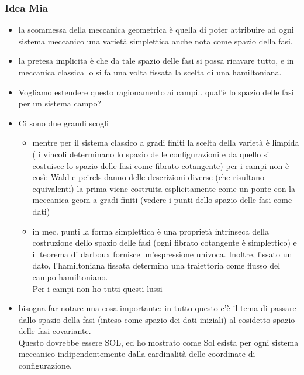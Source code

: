 \documentclass[Main]{subfiles}
\begin{document}
		\subsubsection{Idea Mia}
			\begin{itemize}
				\item la scommessa della meccanica geometrica è quella di poter attribuire ad ogni sistema meccanico una varietà simplettica anche nota come spazio della fasi.
				\item la pretesa implicita è che da tale spazio delle fasi si possa ricavare tutto, e in meccanica classica lo si fa una volta fissata la scelta di una hamiltoniana.
				\item Vogliamo estendere questo ragionamento ai campi.. qual'è lo spazio delle fasi per un sistema campo?
				\item Ci sono due grandi scogli
					\begin{itemize}
						\item mentre per il sistema classico a gradi finiti la scelta della varietà è limpida ( i vincoli determinano lo spazio delle configurazioni e da quello si costuisce lo spazio delle fasi come fibrato cotangente) per i campi non è così: Wald e peirels danno delle descrizioni diverse (che risultano equivalenti) la prima viene costruita esplicitamente come un ponte  con la meccanica geom a gradi finiti (vedere i punti dello spazio delle fasi come dati)
						\item in mec. punti la forma simplettica è una proprietà intrinseca della costruzione dello spazio delle fasi (ogni fibrato cotangente è simplettico) e il teorema di darboux fornisce un'espressione univoca.
							Inoltre, fissato un dato, l'hamiltoniana fissata determina una traiettoria come flusso del campo hamiltoniano.\\
							Per i campi non ho tutti questi lussi				
					\end{itemize}
				\item bisogna far notare una cosa importante: in tutto questo c'è il tema di passare dallo spazio della fasi (inteso come spazio dei dati iniziali) al cosidetto spazio delle fasi covariante.\\
					Questo dovrebbe essere SOL, ed ho mostrato come Sol esista per ogni sistema meccanico indipendentemente dalla cardinalità delle coordinate di configurazione.
			\end{itemize}		


	\newpage
\end{document}
